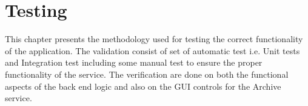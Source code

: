 \chapter{Testing}
This chapter presents the methodology used for testing the correct functionality of the application. The validation consist of set of automatic test i.e.
Unit tests and Integration test including some manual test to ensure the proper functionality of the service. The verification are done on both the functional
aspects of the back end logic and also on the GUI controls for the Archive service.

